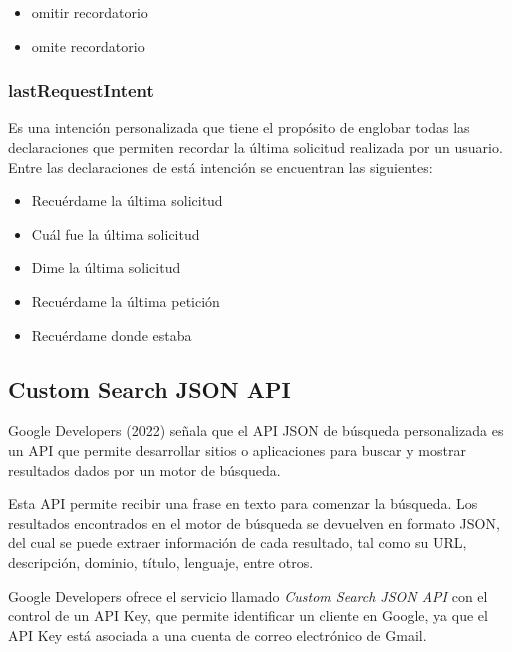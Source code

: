 \begin{itemize}
  \item omitir recordatorio
  \item omite recordatorio
\end{itemize}


\subsubsection{lastRequestIntent}
\label{lastRequestIntentcapIV}

Es una intención personalizada que tiene el propósito de englobar todas las declaraciones que permiten recordar la última solicitud realizada por un usuario. Entre las declaraciones de está intención se encuentran las siguientes:

\begin{itemize}
  \item Recuérdame la última solicitud
  \item Cuál fue la última solicitud
  \item Dime la última solicitud
  \item Recuérdame la última petición
  \item Recuérdame donde estaba
\end{itemize}


\subsection{Custom Search JSON API}
\label{CustomSearchJSONAPIcapIV}

Google Developers (2022) señala que el API JSON de búsqueda personalizada es un API que permite desarrollar sitios o aplicaciones para buscar y mostrar resultados dados por un motor de búsqueda.

Esta API permite recibir una frase en texto para comenzar la búsqueda. Los resultados encontrados en el motor de búsqueda se devuelven en formato JSON, del cual se puede extraer información de cada resultado, tal como su URL, descripción, dominio, título, lenguaje, entre otros.

Google Developers ofrece el servicio llamado \textit{Custom Search JSON API} con el control de un API Key, que permite identificar un cliente en Google, ya que el API Key está asociada a una cuenta de correo electrónico de Gmail.

